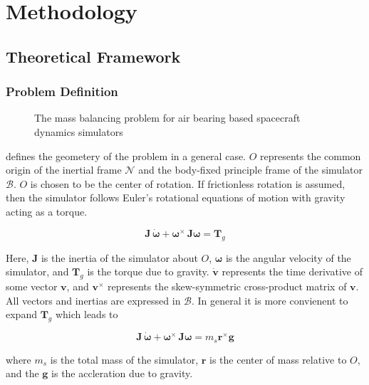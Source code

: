 \chapter{Methodology}\label{chap:methodology}

\section{Theoretical Framework}\label{sec:framework}
\subsection{Problem Definition}\label{sec:mbs_problem}

\begin{figure}
    \centering
    
    \caption{The mass balancing problem for air bearing based spacecraft dynamics simulators}
    \label{fig:mbs_problem}
\end{figure}


 defines the geometery of the problem in a general case. $O$ represents the common origin of the inertial frame $\mathcal{N}$ and the body-fixed principle frame of the simulator $\mathcal{B}$. $O$ is chosen to be the center of rotation. If frictionless rotation is assumed, then the simulator follows Euler's rotational equations of motion with gravity acting as a torque. 

\begin{equation}
    \bm{J}\,\dot{\bm{\omega}} + \bm{\omega}^{\times}\,\bm{J}\bm{\omega} = \bm{T}_g
\end{equation}

Here, $\bm{J}$ is the inertia of the simulator about $O$, $\bm{\omega}$ is the angular velocity of the simulator, and $\bm{T}_g$ is the torque due to gravity. $\dot{\bm{v}}$ represents the time derivative of some vector $\bm{v}$, and $\bm{v}^{\times}$ represents the skew-symmetric cross-product matrix of $\bm{v}$. All vectors and inertias are expressed in $\mathcal{B}$. In general it is more convienent to expand $\bm{T}_g$ which leads to

\begin{equation}\label{equation:starting_eom}
    \bm{J}\,\dot{\bm{\omega}} + \bm{\omega}^{\times}\,\bm{J}\bm{\omega} = m_s\bm{r}^{\times}\bm{g}
\end{equation}

where $m_s$ is the total mass of the simulator, $\bm{r}$ is the center of mass relative to $O$, and the $\bm{g}$ is the accleration due to gravity.


